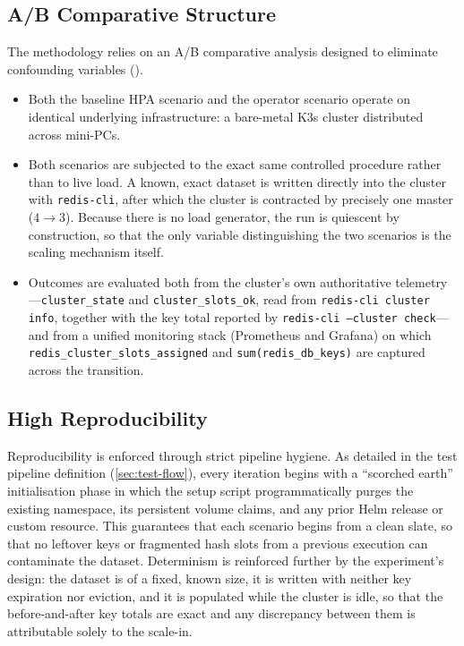 \subsection{A/B Comparative Structure}
The methodology relies on an A/B comparative analysis designed to eliminate confounding variables (\cite{k8s_statefulsets}).
\begin{itemize}
    \item Both the baseline HPA scenario and the operator scenario operate on identical underlying infrastructure: a bare-metal K3s cluster distributed across mini-PCs.
    \item Both scenarios are subjected to the exact same controlled procedure rather than to live load. A known, exact dataset is written directly into the cluster with \texttt{redis-cli}, after which the cluster is contracted by precisely one master ($4 \rightarrow 3$). Because there is no load generator, the run is quiescent by construction, so that the only variable distinguishing the two scenarios is the scaling mechanism itself.
    \item Outcomes are evaluated both from the cluster's own authoritative telemetry---\texttt{cluster\_state} and \texttt{cluster\_slots\_ok}, read from \texttt{redis-cli cluster info}, together with the key total reported by \texttt{redis-cli --cluster check}---and from a unified monitoring stack (Prometheus and Grafana) on which \texttt{redis\_cluster\_slots\_assigned} and \texttt{sum(redis\_db\_keys)} are captured across the transition.
\end{itemize}

\subsection{High Reproducibility}
Reproducibility is enforced through strict pipeline hygiene. As detailed in the test pipeline definition (\ref{sec:test-flow}), every iteration begins with a \enquote{scorched earth} initialisation phase in which the setup script programmatically purges the existing namespace, its persistent volume claims, and any prior Helm release or custom resource. This guarantees that each scenario begins from a clean slate, so that no leftover keys or fragmented hash slots from a previous execution can contaminate the dataset. Determinism is reinforced further by the experiment's design: the dataset is of a fixed, known size, it is written with neither key expiration nor eviction, and it is populated while the cluster is idle, so that the before-and-after key totals are exact and any discrepancy between them is attributable solely to the scale-in.

